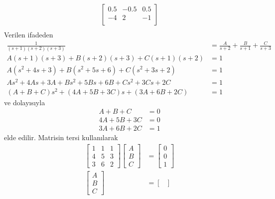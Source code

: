 \begin{enumerate}[\bfseries S1.]
\begin{equation*}
\begin{split}
\begin{bmatrix}
                0.5&   -0.5&    0.5\\
               -4&    2&   -1\\
            \end{bmatrix}\\
        \end{split}
        \end{equation*}
    Verilen ifadeden 
    \begin{equation}
    \begin{split}
        \frac{1}{(s+1)(s+2)(s+3)}&=\frac{A}{s+2}+\frac{B}{s+1}+\frac{C}{s+3}\\
        A(s+1)(s+3)+B(s+2)(s+3)+C(s+1)(s+2)&=1\\
        A(s^2+4s+3)+B(s^2+5s+6)+C(s^2+3s+2)&=1\\
        As^2+4As+3A+Bs^2+5Bs+6B+Cs^2+3Cs+2C&=1\\
        (A+B+C)s^2+(4A+5B+3C)s+(3A+6B+2C)&=1
    \end{split}
    \end{equation}
    ve dolayısıyla  
    \begin{equation}
        \begin{split}
            A+B+C&=0\\
            4A+5B+3C&=0\\
            3A+6B+2C&=1
        \end{split}
    \end{equation}
    elde edilir. Matrisin tersi kullanılarak
    \begin{equation}
        \begin{split}
        \begin{bmatrix}
            1& 1& 1\\
            4& 5& 3\\
            3& 6& 2
        \end{bmatrix}\begin{bmatrix}A\\B\\C\end{bmatrix}&=\begin{bmatrix}0\\0\\1\end{bmatrix}\\
        \begin{bmatrix}A\\B\\C\end{bmatrix}&=\begin{bmatrix}

\end{bmatrix}
\end{split}
\end{equation}
\end{enumerate}
